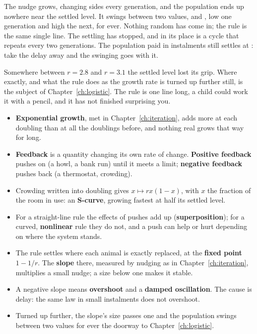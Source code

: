 


\noindent
The nudge grows, changing sides every generation, and the population ends
up nowhere near the settled level. It swings between two values,
 and , low one generation and high the
next, for ever. Nothing random has come in; the rule is the same single line.
The settling has stopped, and in its place is a cycle that repeats every two
generations. The population paid in instalments still settles at
: take the delay away and the swinging goes with it.

Somewhere between $r = \num{2.8}$ and $r = \num{3.1}$ the settled level lost
its grip. Where exactly, and what the rule does as the growth rate is turned
up further still, is the subject of Chapter~\ref{ch:logistic}. The rule is
one line long, a child could work it with a pencil, and it has not finished
surprising you.

\begin{summarybox}
\begin{itemize}
\item \textbf{Exponential growth}, met in Chapter~\ref{ch:iteration}, adds
  more at each doubling than at all the doublings before, and nothing real
  grows that way for long.
\item \textbf{Feedback} is a quantity changing its own rate of change.
  \textbf{Positive feedback} pushes on (a howl, a bank run) until it meets a
  limit; \textbf{negative feedback} pushes back (a thermostat, crowding).
\item Crowding written into doubling gives $x \mapsto r x (1 - x)$, with $x$ the
  fraction of the room in use: an \textbf{S-curve}, growing fastest at half
  its settled level.
\item For a straight-line rule the effects of pushes add up
  (\textbf{superposition}); for a curved, \textbf{nonlinear} rule they do
  not, and a push can help or hurt depending on where the system stands.
\item The rule settles where each animal is exactly replaced, at the
  \textbf{fixed point} $1 - 1/r$. The \textbf{slope} there, measured by
  nudging as in Chapter~\ref{ch:iteration}, multiplies a small nudge; a size
  below one makes it stable.
\item A negative slope means \textbf{overshoot} and a \textbf{damped
  oscillation}. The cause is delay: the same law in small instalments does
  not overshoot.
\item Turned up further, the slope's size passes one and the population
  swings between two values for ever \dash{} the doorway to
  Chapter~\ref{ch:logistic}.
\end{itemize}
\end{summarybox}

